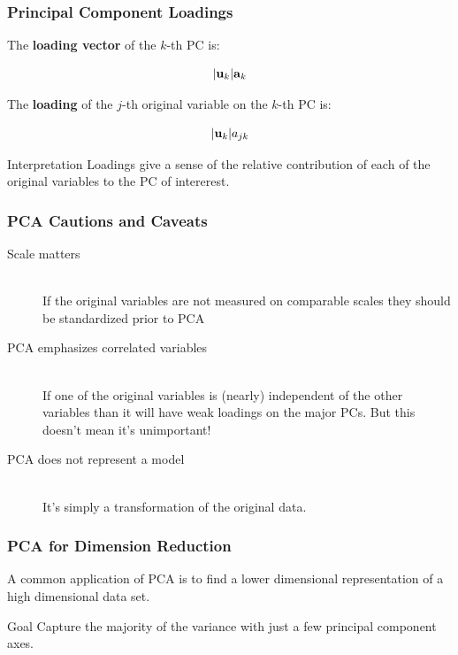 \documentclass{beamer}
\begin{document}
\begin{frame}
  \frametitle{Principal Component Loadings}

The \textbf{loading vector} of the $k$-th PC is:

\[
|\mathbf{u}_k|\mathbf{a}_k
\]

The \textbf{loading} of the $j$-th original variable on the $k$-th PC is:

\[
|\mathbf{u}_k|a_{jk}
\]

\begin{block}{Interpretation}
Loadings give a sense of the relative contribution of each of the original variables to the PC of intererest.
\end{block}

\end{frame}

\begin{frame}
  \frametitle{PCA Cautions and Caveats}

\begin{description}

\item[Scale matters] \mbox{}\\
If the original variables are not measured on comparable scales they should be standardized prior to PCA

\item[PCA emphasizes correlated variables] \mbox{}\\
If one of the original variables is (nearly) independent of the other variables than it will have weak loadings on the major PCs. But this doesn't mean it's unimportant!

\item[PCA does not represent a model] \mbox{}\\
It's simply a transformation of the original data.

\end{description}

\end{frame}

\begin{frame}
  \frametitle{PCA for Dimension Reduction}


A common application of PCA is to find a lower dimensional representation of a high dimensional data set.
\bigskip 

\begin{block}{Goal}
Capture the majority of the variance with just a few principal component axes.
\end{block}

\end{frame}
\end{document}
